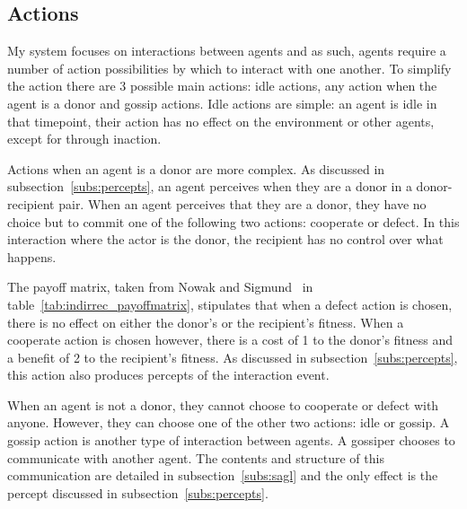 \documentclass[]{final_report}
\begin{document}
\subsection{Actions}
\label{subs:actions}
My system focuses on interactions between agents and as such, agents require a number of action possibilities by which to interact with one another. To simplify the action there are 3 possible main actions: idle actions, any action when the agent is a donor and gossip actions. Idle actions are simple: an agent is idle in that timepoint, their action has no effect on the environment or other agents, except for through inaction.\par
Actions when an agent is a donor are more complex. As discussed in subsection~\ref{subs:percepts}, an agent perceives when they are a donor in a donor-recipient pair. When an agent perceives that they are a donor, they have no choice but to commit one of the following two actions: cooperate or defect. In this interaction where the actor is the donor, the recipient has no control over what happens.\par
The payoff matrix, taken from Nowak and Sigmund~\cite{evol_indirect_image} in table~\ref{tab:indirrec_payoffmatrix}, stipulates that when a defect action is chosen, there is no effect on either the donor's or the recipient's fitness. When a cooperate action is chosen however, there is a cost of 1 to the donor's fitness and a benefit of 2 to the recipient's fitness. As discussed in subsection~\ref{subs:percepts}, this action also produces percepts of the interaction event.\par 
When an agent is not a donor, they cannot choose to cooperate or defect with anyone. However, they can choose one of the other two actions: idle or gossip. A gossip action is another type of interaction between agents. A gossiper chooses to communicate with another agent. The contents and structure of this communication are detailed in subsection~\ref{subs:sagl} and the only effect is the percept discussed in subsection~\ref{subs:percepts}.
\end{document}
